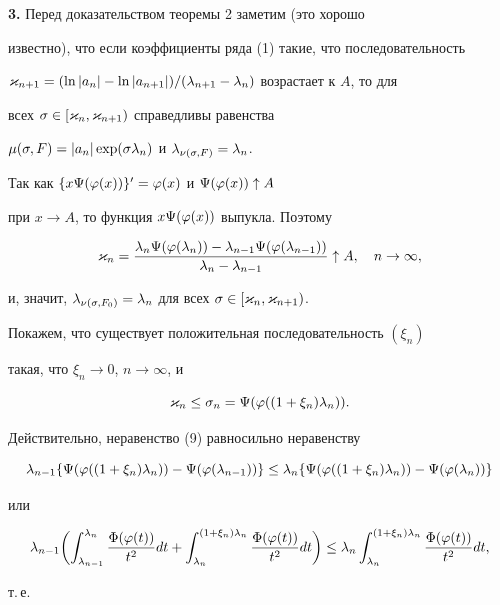 {\bf 3.} Перед доказательством теоремы 2 заметим (это хорошо


известно), что если коэффициенты ряда (1) такие, что последовательность


$\varkappa_{n+1}=(\ln|a_n|-\ln|a_{n+1}|)/(\lambda_{n+1}-\lambda_n)$ возрастает к $A$, то для


всех $\sigma\in[\varkappa_n,\varkappa_{n+1})$ справедливы равенства 


$\mu(\sigma,F)=|a_n|\exp(\sigma\lambda_n)$ и $\lambda_{\nu(\sigma,F)}=\lambda_n$.





Так как $\{x\Psi(\varphi(x))\}'=\varphi(x)$ и $\Psi(\varphi(x))\uparrow A$


при $x\to A$, то функция $x\Psi(\varphi(x))$ выпукла. Поэтому


$$


\k_n=\frac{\la_n\F(\p(\la_n))-\la_{n-1}\F(\p(\la_{n-1}))}{\la_n-\la_{n-1}}


\uparrow A,\quad n\to\infty,


$$


и, значит, $\lambda_{\nu(\sigma,F_0)}=\lambda_n$  для всех $\sigma\in[\varkappa_n,\varkappa_{n+1})$.





Покажем, что существует положительная последовательность $(\xi_n)$


такая, что $\xi_n\to 0$, $n\to \infty$, и


\begin{equation}


\k_n\le\s_n=\F(\p((1+\xi_n)\la_n)).


\end{equation}


Действительно, неравенство (9) равносильно неравенству


$$


\la_{n-1}\{\F(\p((1+\xi_n)\la_n))-\F(\p(\la_{n-1}))\}\le


\la_n\{\F(\p((1+\xi_n)\la_n))-\F(\p(\la_n))\}


$$


или


$$


\la_{n-1}\biggl(\int_{\la_{n-1}}^{\la_n}\frac{\Phi(\p(t))}{t^2}dt+


\int_{\la_n}^{(1+\xi_n)\la_n}\frac{\Phi(\p(t))}{t^2}dt\biggr)\le


\la_n\int_{\la_n}^{(1+\xi_n)\la_n}\frac{\Phi(\p(t))}{t^2}dt,


$$


т.\,е.


